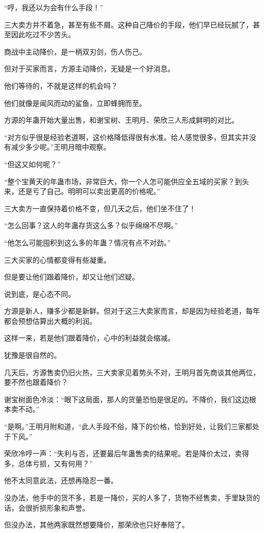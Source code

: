 \begin{this_body}
“哼，我还以为会有什么手段！”

三大卖方并不着急，甚至有些不屑。这种自己降价的手段，他们早已经玩腻了，甚至因此吃过不少苦头。

商战中主动降价，是一柄双刃剑，伤人伤己。

但对于买家而言，方源主动降价，无疑是一个好消息。

他们等待的，不就是这样的机会吗？

他们就像是闻风而动的鲨鱼，立即蜂拥而至。

方源的年蛊开始大量出售，和谢宝树、王明月、荣欣三人形成鲜明的对比。

“对方似乎很是经验老道啊，这价格降低得很有水准。给人感觉很多，但其实并没有减少多少呢。”王明月暗中观察。

“但这又如何呢？”

“整个宝黄天的年蛊市场，非常巨大，你一个人怎可能供应全五域的买家？到头来，还是亏了自己。明明可以卖出更高的价格呢。”

三大卖方一直保持着价格不变，但几天之后，他们坐不住了！

“怎么回事？这人的年蛊存货这么多？似乎绵绵不尽啊。”

“他怎么可能囤积到这么多的年蛊？情况有点不对劲。”

三大买家的心情都变得有些凝重。

但是要让他们跟着降价，却又让他们迟疑。

说到底，是心态不同。

方源是新人，赚多少都是新鲜。但对于这三大卖家而言，却是因为经验老道，每年都会预想估算出大概的利润。

这样一来，若是他们跟着降价，心中的利益就会缩减。

犹豫是很自然的。

几天后，方源售卖仍旧火热，三大卖家见着势头不对，王明月首先商谈其他两位，要不然也跟着降价？

谢宝树面色冷淡：“眼下这局面，那人的货量恐怕是很足的。不降价，我们这边根本卖不动。”

“是啊。”王明月附和道，“此人手段不俗，降下的价格，恰到好处，让我们三家都处于下风。”

荣欣冷哼一声：“失利与否，还要最后年蛊售卖的结果呢。若是降价太过，卖得多，总体亏损，又有何用？”

他不太同意此法，还想再隐忍一番。

没办法，他手中的货不多，若是一降价，买的人多了，货物不经售卖，手里缺货的话，会很折损形象和声誉。

但没办法，其他两家既然想要降价，那荣欣也只好奉陪了。

\end{this_body}

